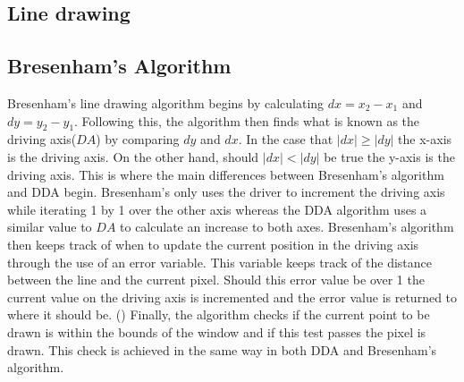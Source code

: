 \documentclass[
	a4paper, %
	10pt, %
]{CSUniSchoolLabReport}
\begin{document}
\subsection{Line drawing}
\subsection*{Bresenham's Algorithm}
\begin{flushleft}
	Bresenham's line drawing algorithm begins by calculating $dx = x_2 - x_1$ and 
	$dy = y_2 - y_1$. Following this, the algorithm then finds what is known as the 
	driving axis($DA$) by comparing $dy$ and $dx$. In the case that $|dx| \geq |dy|$ the x-axis 
	is the driving axis. On the other hand, should $|dx| < |dy|$ be true the y-axis is the 
	driving axis. This is where the main differences between Bresenham's algorithm and DDA 
	begin. Bresenham's only uses the driver to increment the driving axis while iterating 1 by 1
	over the other axis whereas the DDA algorithm uses a similar value to $DA$ to calculate an 
	increase to both axes. Bresenham's algorithm then keeps track of when to update the current position 
	in the driving axis through the use of an error variable. This variable keeps track of the 
	distance between the line and the current pixel. Should this error value be over 1 the current value 
	on the driving axis is incremented and the error value is returned to where it should be.
	(\cite{Madan:2014})
	Finally, the algorithm checks if the current point to be drawn is within the bounds of the window 
	and if this test passes the pixel is drawn. This check is achieved in the same way in both 
	DDA and Bresenham's algorithm.
\end{flushleft}
\end{document}
